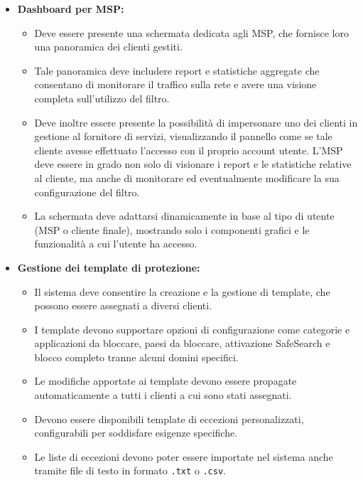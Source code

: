 \begin{itemize}
  \item \textbf{Dashboard per MSP:}
    \begin{itemize}
      \item Deve essere presente una schermata dedicata agli MSP, che fornisce loro una panoramica dei clienti gestiti.
      \item Tale panoramica deve includere report e statistiche aggregate che consentano di monitorare il traffico sulla rete e avere una visione completa sull'utilizzo del filtro.
      \item Deve inoltre essere presente la possibilità di impersonare uno dei clienti in gestione al fornitore di servizi, visualizzando il pannello come se tale cliente avesse effettuato l'accesso con il proprio account utente. L’MSP deve essere in grado non solo di visionare i report e le statistiche relative al cliente, ma anche di monitorare ed eventualmente modificare la sua configurazione del filtro.
      \item La schermata deve adattarsi dinamicamente in base al tipo di utente (MSP o cliente finale), mostrando solo i componenti grafici e le funzionalità a cui l’utente ha accesso.
    \end{itemize}

  \item \textbf{Gestione dei template di protezione:}
    \begin{itemize}
      \item Il sistema deve consentire la creazione e la gestione di template, che possono essere assegnati a diversi clienti.
      \item I template devono supportare opzioni di configurazione come categorie e applicazioni da bloccare, paesi da bloccare, attivazione SafeSearch e blocco completo tranne alcuni domini specifici.
      \item Le modifiche apportate ai template devono essere propagate automaticamente a tutti i clienti a cui sono stati assegnati.
      \item Devono essere disponibili template di eccezioni personalizzati, configurabili per soddisfare esigenze specifiche.
      \item Le liste di eccezioni devono poter essere importate nel sistema anche tramite file di testo in formato \texttt{.txt} o \texttt{.csv}.
    \end{itemize}


\end{itemize}
